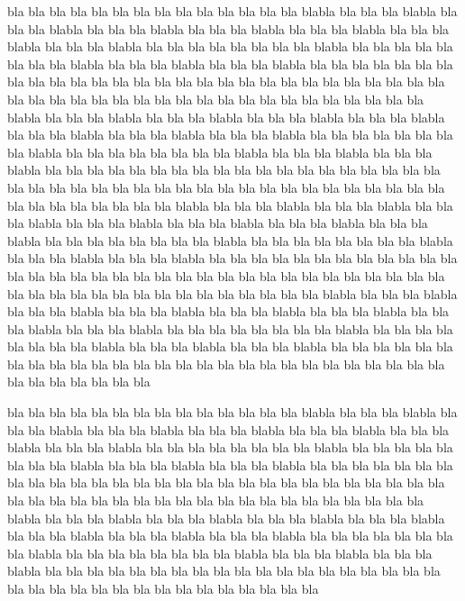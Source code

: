 \documentclass[11pt]{report}
\begin{document}
bla bla bla bla bla bla bla bla bla bla bla bla bla bla blabla bla bla bla blabla bla bla bla blabla bla bla bla blabla bla bla bla blabla bla bla bla blabla bla bla bla blabla bla bla bla blabla bla bla bla bla bla bla bla bla blabla bla bla bla bla bla bla bla bla blabla bla bla bla blabla bla bla bla blabla bla bla bla bla bla bla bla bla bla bla bla bla bla bla bla bla bla bla bla bla bla bla bla bla bla bla bla bla bla bla bla bla bla bla
bla bla bla bla bla bla bla bla bla bla bla bla bla bla blabla bla bla bla blabla bla bla bla blabla bla bla bla blabla bla bla bla blabla bla bla bla blabla bla bla bla blabla bla bla bla blabla bla bla bla bla bla bla bla bla blabla bla bla bla bla bla bla bla bla blabla bla bla bla blabla bla bla bla blabla bla bla bla bla bla bla bla bla bla bla bla bla bla bla bla bla bla bla bla bla bla bla bla bla bla bla bla bla bla bla bla bla bla bla
bla bla bla bla bla bla bla bla bla bla bla bla bla bla blabla bla bla bla blabla bla bla bla blabla bla bla bla blabla bla bla bla blabla bla bla bla blabla bla bla bla blabla bla bla bla blabla bla bla bla bla bla bla bla bla blabla bla bla bla bla bla bla bla bla blabla bla bla bla blabla bla bla bla blabla bla bla bla bla bla bla bla bla bla bla bla bla bla bla bla bla bla bla bla bla bla bla bla bla bla bla bla bla bla bla bla bla bla bla
bla bla bla bla bla bla bla bla bla bla bla bla bla bla blabla bla bla bla blabla bla bla bla blabla bla bla bla blabla bla bla bla blabla bla bla bla blabla bla bla bla blabla bla bla bla blabla bla bla bla bla bla bla bla bla blabla bla bla bla bla bla bla bla bla blabla bla bla bla blabla bla bla bla blabla bla bla bla bla bla bla bla bla bla bla bla bla bla bla bla bla bla bla bla bla bla bla bla bla bla bla bla bla bla bla bla bla bla bla


bla bla bla bla bla bla bla bla bla bla bla bla bla bla blabla bla bla bla blabla bla bla bla blabla bla bla bla blabla bla bla bla blabla bla bla bla blabla bla bla bla blabla bla bla bla blabla bla bla bla bla bla bla bla bla blabla bla bla bla bla bla bla bla bla blabla bla bla bla blabla bla bla bla blabla bla bla bla bla bla bla bla bla bla bla bla bla bla bla bla bla bla bla bla bla bla bla bla bla bla bla bla bla bla bla bla bla bla bla
bla bla bla bla bla bla bla bla bla bla bla bla bla bla blabla bla bla bla blabla bla bla bla blabla bla bla bla blabla bla bla bla blabla bla bla bla blabla bla bla bla blabla bla bla bla blabla bla bla bla bla bla bla bla bla blabla bla bla bla bla bla bla bla bla blabla bla bla bla blabla bla bla bla blabla bla bla bla bla bla bla bla bla bla bla bla bla bla bla bla bla bla bla bla bla bla bla bla bla bla bla bla bla bla bla bla bla bla bla
\end{document}
